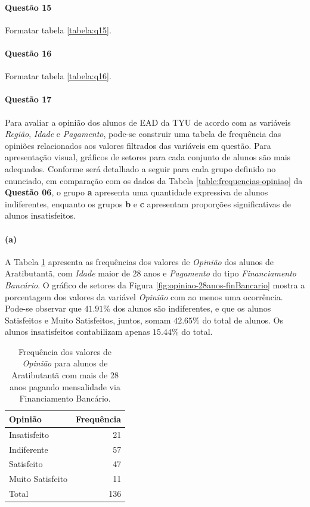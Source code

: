 \documentclass[10pt,a4paper,oneside]{article}
\newcommand{\arat}{Aratibutantã\xspace}
\begin{document}
\FloatBarrier
\paragraph{Questão 15}
Formatar tabela \ref{tabela:q15}.


\FloatBarrier
\paragraph{Questão 16}
Formatar tabela \ref{tabela:q16}.


\FloatBarrier
\paragraph{Questão 17}

Para avaliar a opinião dos alunos de EAD da TYU de acordo com as variáveis \textit{Região}, \textit{Idade} e \textit{Pagamento}, pode-se construir uma tabela de frequência das opiniões relacionados aos valores filtrados das variáveis em questão. Para apresentação visual, gráficos de setores para cada conjunto de alunos são mais adequados. Conforme será detalhado a seguir para cada grupo definido no enunciado, em comparação com os dados da Tabela \ref{table:frequencias-opiniao} da \textbf{Questão 06}, o grupo \textbf{a} apresenta uma quantidade expressiva de alunos indiferentes, enquanto os grupos \textbf{b} e \textbf{c} apresentam proporções significativas de alunos insatisfeitos.

\paragraph{(a)} A Tabela \ref{table:opiniao-28anos-finBancario} apresenta as frequências dos valores de \textit{Opinião} dos alunos de \arat, com \textit{Idade} maior de 28 anos e \textit{Pagamento} do tipo \textit{Financiamento Bancário}. O gráfico de setores da Figura \ref{fig:opiniao-28anos-finBancario} mostra a porcentagem dos valores da variável \textit{Opinião} com ao menos uma ocorrência.
Pode-se observar que $41.91\%$ dos alunos são indiferentes, e que os alunos Satisfeitos e Muito Satisfeitos, juntos, somam $42.65\%$ do total de alunos. Os alunos insatisfeitos contabilizam apenas $15.44\%$ do total.


\begin{table}[!h]
	\small
	\centering
	\caption{Frequência dos valores de \textit{Opinião} para alunos de \arat com mais de 28 anos pagando mensalidade via Financiamento Bancário.}
	\label{table:opiniao-28anos-finBancario}
	\begin{tabular}{l r}
		\toprule
		\textbf{Opinião} & \textbf{Frequência} \\
		\midrule
		Insatisfeito     &  21 \\
		Indiferente      &  57 \\
		Satisfeito       &  47 \\
		Muito Satisfeito &  11 \\
		\midrule
		Total            &  136 \\
		\bottomrule
	\end{tabular}
\end{table}
\end{document}
